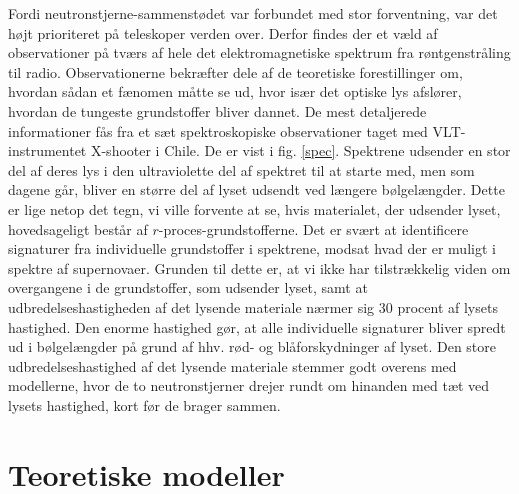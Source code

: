 \documentclass[twocolumn]{article}
\begin{document}
Fordi neutronstjerne-sammenstødet var forbundet med stor forventning, var det højt prioriteret på teleskoper verden over. Derfor findes der et væld af observationer på tværs af hele det elektromagnetiske spektrum fra røntgenstråling til radio. Observationerne bekræfter dele af de teoretiske forestillinger om, hvordan sådan et fænomen måtte se ud, hvor især det optiske lys afslører, hvordan de tungeste grundstoffer bliver dannet. De mest detaljerede informationer fås fra et sæt spektroskopiske observationer taget med VLT-instrumentet X-shooter i Chile. De er vist i fig. \ref{spec}. Spektrene udsender en stor del af deres lys i den ultraviolette del af spektret til at starte med, men som dagene går, bliver en større del af lyset udsendt ved længere bølgelængder. Dette er lige netop det tegn, vi ville forvente at se, hvis materialet, der udsender lyset, hovedsageligt består af $r$-proces-grundstofferne. Det er svært at identificere signaturer fra individuelle grundstoffer i spektrene, modsat hvad der er muligt i spektre af supernovaer. Grunden til dette er, at vi ikke har tilstrækkelig viden om overgangene i de grundstoffer, som udsender lyset, samt at udbredelseshastigheden af det lysende materiale nærmer sig 30 procent af lysets hastighed. Den enorme hastighed gør, at alle individuelle signaturer bliver spredt ud i bølgelængder på grund af hhv. rød- og blåforskydninger af lyset. Den store udbredelseshastighed af det lysende materiale stemmer godt overens med modellerne, hvor de to neutronstjerner drejer rundt om hinanden med tæt ved lysets hastighed, kort før de brager sammen. 


\section{Teoretiske modeller}\label{teo}
\end{document}
